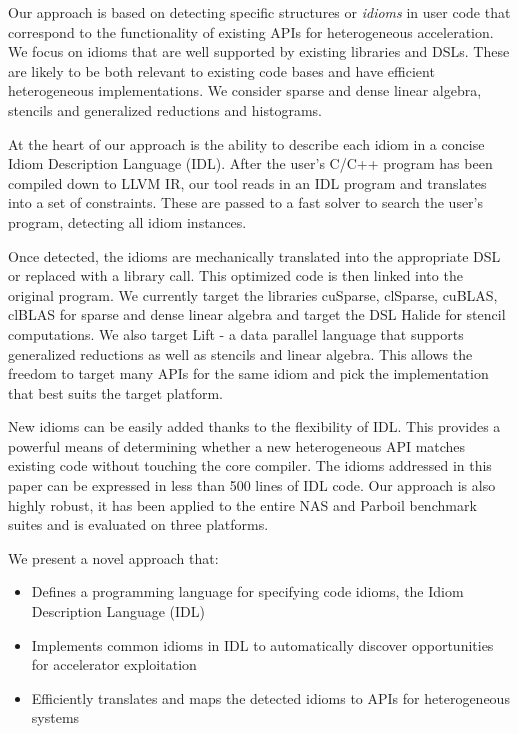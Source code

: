    Our approach is based on detecting specific structures or {\em idioms} in
    user code that correspond to the functionality of existing APIs for
    heterogeneous acceleration.
    We focus on idioms that are well supported by existing libraries and DSLs.
    These are likely to be both relevant to existing code bases and have
    efficient heterogeneous implementations.
    We consider sparse and dense linear algebra, stencils and generalized
    reductions and histograms.

    At the heart of our approach is the ability to describe each idiom in a
    concise Idiom Description Language (IDL).
    After the user's C/C++ program has been compiled down to LLVM IR, our tool
    reads in an IDL program and translates into a set of constraints.
    These are passed to a fast solver to search the user's program, detecting
    all idiom instances.

    Once detected, the idioms are mechanically translated into the appropriate
    DSL or replaced with a library call.
    This optimized code is then linked into the original program.
    We currently target the libraries cuSparse, clSparse, cuBLAS, clBLAS for
    sparse and dense linear algebra and target the DSL Halide
    \cite{Ragan-Kelley2013Halide} for stencil computations.
    We also target Lift \cite{SteuwerRD17} - a data parallel language that
    supports generalized reductions as well as stencils and linear algebra.
    This allows the freedom to target many APIs for the same idiom and pick the
    implementation that best suits the target platform. 

    New idioms can be easily added thanks to the flexibility of IDL.
    This provides a powerful means of determining whether a new heterogeneous
    API matches existing code without touching the core compiler.
    The idioms addressed in this paper can be expressed in less than 500 lines
    of IDL code.
    Our approach is also highly robust, it has been applied to the entire NAS
    and Parboil benchmark suites and is evaluated on three platforms.

    We present a novel approach that:
    \begin{itemize}
    \item Defines a programming language for specifying code idioms, the Idiom
          Description Language (IDL)\\[-.9em]
    \item Implements common idioms in IDL to automatically discover
          opportunities for accelerator exploitation\\[-.9em]
    \item Efficiently translates and maps the detected idioms to APIs for
          heterogeneous systems
    \end{itemize}

